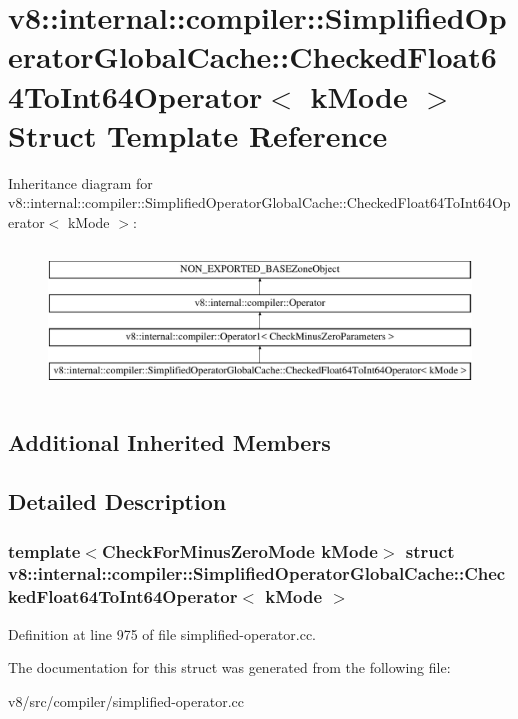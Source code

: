 \hypertarget{structv8_1_1internal_1_1compiler_1_1SimplifiedOperatorGlobalCache_1_1CheckedFloat64ToInt64Operator}{}\section{v8\+:\+:internal\+:\+:compiler\+:\+:Simplified\+Operator\+Global\+Cache\+:\+:Checked\+Float64\+To\+Int64\+Operator$<$ k\+Mode $>$ Struct Template Reference}
\label{structv8_1_1internal_1_1compiler_1_1SimplifiedOperatorGlobalCache_1_1CheckedFloat64ToInt64Operator}
Inheritance diagram for v8\+:\+:internal\+:\+:compiler\+:\+:Simplified\+Operator\+Global\+Cache\+:\+:Checked\+Float64\+To\+Int64\+Operator$<$ k\+Mode $>$\+:\begin{figure}[H]
\begin{center}
\leavevmode
\includegraphics[height=3.916084cm]{structv8_1_1internal_1_1compiler_1_1SimplifiedOperatorGlobalCache_1_1CheckedFloat64ToInt64Operator}
\end{center}
\end{figure}
\subsection*{Additional Inherited Members}


\subsection{Detailed Description}
\subsubsection*{template$<$Check\+For\+Minus\+Zero\+Mode k\+Mode$>$\newline
struct v8\+::internal\+::compiler\+::\+Simplified\+Operator\+Global\+Cache\+::\+Checked\+Float64\+To\+Int64\+Operator$<$ k\+Mode $>$}



Definition at line 975 of file simplified-\/operator.\+cc.



The documentation for this struct was generated from the following file\+:\begin{DoxyCompactItemize}
\item 
v8/src/compiler/simplified-\/operator.\+cc\end{DoxyCompactItemize}
